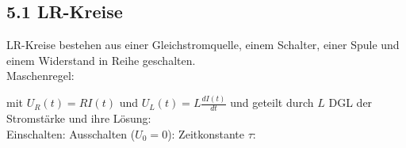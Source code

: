 \subsection{5.1 LR-Kreise}
    LR-Kreise bestehen aus einer Gleichstromquelle, einem Schalter, einer Spule und einem Widerstand in Reihe geschalten.\\
    Maschenregel:

    mit $U_R(t) = R I(t)$ und $U_L(t) = L \frac{dI(t)}{dt}$ und geteilt durch $L$
    DGL der Stromstärke und ihre Lösung:\\
    Einschalten:
    Ausschalten ($U_0 = 0$):
    Zeitkonstante $\tau$:
